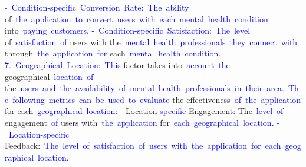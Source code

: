 \documentclass{article}
\begin{document}
\begin{tcolorbox}[colframe=black,colback=white]
{}\textcolor{blue}{-}\textcolor{blue}{~Condition}\textcolor{blue}{-specific}\textcolor{blue}{~Conversion}\textcolor{blue}{~Rate}\textcolor{blue}{:}\textcolor{blue}{~The}\textcolor{blue}{~ability} of\textcolor{blue}{~the}\textcolor{blue}{~application}\textcolor{blue}{~to}\textcolor{blue}{~convert}\textcolor{blue}{~users}\textcolor{blue}{~with}\textcolor{blue}{~each}\textcolor{blue}{~mental}\textcolor{blue}{~health}\textcolor{blue}{~condition} into\textcolor{blue}{~paying}\textcolor{blue}{~customers}\textcolor{blue}{.
}\textcolor{blue}{-}\textcolor{blue}{~Condition}\textcolor{blue}{-specific}\textcolor{blue}{~Satisfaction}\textcolor{blue}{:}\textcolor{blue}{~The}\textcolor{blue}{~level} of\textcolor{blue}{~satisfaction}\textcolor{blue}{~of} users with the\textcolor{blue}{~mental}\textcolor{blue}{~health}\textcolor{blue}{~professionals}\textcolor{blue}{~they}\textcolor{blue}{~connect}\textcolor{blue}{~with} through\textcolor{blue}{~the}\textcolor{blue}{~application}\textcolor{blue}{~for} each\textcolor{blue}{~mental}\textcolor{blue}{~health}\textcolor{blue}{~condition}\textcolor{blue}{.
}\textcolor{blue}{7}.\textcolor{blue}{~Ge}\textcolor{blue}{ographical}\textcolor{blue}{~Location}\textcolor{blue}{:}\textcolor{blue}{~This} factor takes into\textcolor{blue}{~account}\textcolor{blue}{~the} geographical\textcolor{blue}{~location}\textcolor{blue}{~of} the\textcolor{blue}{~users}\textcolor{blue}{~and}\textcolor{blue}{~the}\textcolor{blue}{~availability}\textcolor{blue}{~of}\textcolor{blue}{~mental}\textcolor{blue}{~health}\textcolor{blue}{~professionals}\textcolor{blue}{~in}\textcolor{blue}{~their}\textcolor{blue}{~area}\textcolor{blue}{.}\textcolor{blue}{~The}\textcolor{blue}{~following}\textcolor{blue}{~metrics}\textcolor{blue}{~can}\textcolor{blue}{~be}\textcolor{blue}{~used}\textcolor{blue}{~to}\textcolor{blue}{~evaluate} the effectiveness\textcolor{blue}{~of}\textcolor{blue}{~the}\textcolor{blue}{~application} for each\textcolor{blue}{~geographical}\textcolor{blue}{~location}\textcolor{blue}{:
}\textcolor{blue}{-} Location\textcolor{blue}{-specific} Engagement\textcolor{blue}{:} The\textcolor{blue}{~level}\textcolor{blue}{~of} engagement\textcolor{blue}{~of} users with\textcolor{blue}{~the}\textcolor{blue}{~application} for\textcolor{blue}{~each}\textcolor{blue}{~geographical}\textcolor{blue}{~location}\textcolor{blue}{.
}\textcolor{blue}{-}\textcolor{blue}{~Location}\textcolor{blue}{-specific} Feedback\textcolor{blue}{:}\textcolor{blue}{~The}\textcolor{blue}{~level}\textcolor{blue}{~of}\textcolor{blue}{~satisfaction}\textcolor{blue}{~of}\textcolor{blue}{~users}\textcolor{blue}{~with}\textcolor{blue}{~the}\textcolor{blue}{~application}\textcolor{blue}{~for}\textcolor{blue}{~each}\textcolor{blue}{~geographical}\textcolor{blue}{~location}\textcolor{blue}{.
}
\end{tcolorbox}
\end{document}

